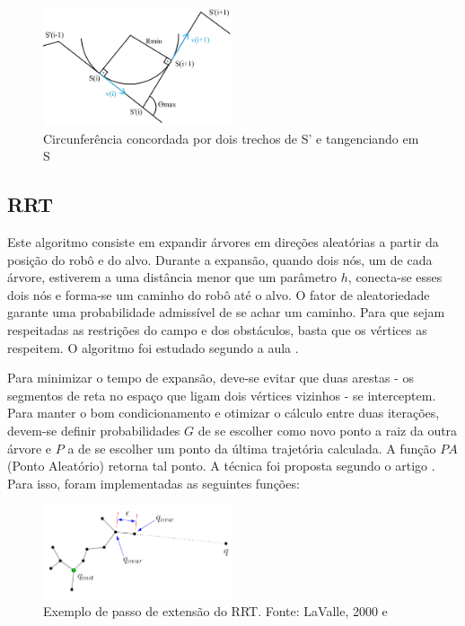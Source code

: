 \documentclass[a4paper,12pt]{article}
\begin{document}
\begin{figure}
	\label{fig: concordancia}
	\centering
	\includegraphics[width=0.5\textwidth]{figures/thetamax.jpg}
   \caption{Circunferência concordada por dois trechos de S' e tangenciando em S}
\end{figure}

\subsection{RRT}

Este algoritmo consiste em expandir árvores em direções aleatórias a partir da posição do robô e do alvo. Durante a expansão, quando dois nós, um de cada árvore, estiverem a uma distância menor que um parâmetro $h$, conecta-se esses dois nós e forma-se um caminho do robô até o alvo. O fator de aleatoriedade garante uma probabilidade admissível de se achar um caminho. Para que sejam respeitadas as restrições do campo e dos obstáculos, basta que os vértices as respeitem. O algoritmo foi estudado segundo a aula \cite{lavalle2011}.

Para minimizar o tempo de expansão, deve-se evitar que duas arestas - os segmentos de reta no espaço que ligam dois vértices vizinhos - se interceptem. Para manter o bom condicionamento e otimizar o cálculo entre duas iterações, devem-se definir probabilidades $G$ de se escolher como novo ponto a raiz da outra árvore e $P$ a de se escolher um ponto da última trajetória calculada. A função $PA$ (Ponto Aleatório) retorna tal ponto. A técnica foi proposta segundo o artigo \cite{james2002}. Para isso, foram implementadas as seguintes funções:

\begin{figure}
	\label{fig: rrt_extend}
	\centering
	\includegraphics[width=0.5\textwidth]{figures/RRT.png}
   \caption{Exemplo de passo de extensão do RRT. Fonte: LaValle, 2000 e \cite{lavalle2011}}
\end{figure}
\end{document}
